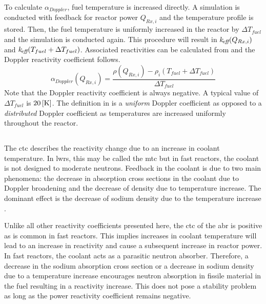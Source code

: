     To calculate $\alpha_{Doppler}$, fuel temperature is increased directly. A
    simulation is conducted with feedback for reactor power $Q_{Rx,i}$ and the
    temperature profile is stored. Then, the fuel temperature is uniformly 
    increased in the reactor by $\Delta T_{fuel}$ and the simulation is
    conducted again. This procedure will result in $k_{\!\mbox{\scriptsize \em eff}}(Q_{Rx,i})$ and
    ${k_{\!\mbox{\scriptsize \em eff}}(T_{fuel} + \Delta T_{fuel})}$. Associated reactivities can be
    calculated from  and the Doppler reactivity coefficient
    follows.
    \begin{equation}
      \label{eq:doppler_reactivity_coefficient}
      \alpha_{Doppler}(Q_{Rx,i}) = \frac{\rho(Q_{Rx,i}) - \rho_i(T_{fuel} +
        \Delta T_{fuel})} {\Delta T_{fuel}}
    \end{equation}
    Note that the Doppler reactivity coefficient is always negative.  A typical
    value of $\Delta T_{fuel}$ is $20\left[\text{{K}}\right]$.  The definition in
     is a \textit{uniform} Doppler
    coefficient as opposed to a \textit{distributed} Doppler coefficient as
    temperatures are increased uniformly throughout the reactor.

  \subsection{\texorpdfstring{}{Coolant Temperature
    Coefficient (CTC)}}
  \label{sec:coolant_temperature_reactivity_coefficient}
    The \gls{ctc} describes the reactivity change due to an increase in coolant
    temperature. In \glspl{lwr}, this may be called the \gls{mtc} but in fast
    reactors, the coolant is not designed to moderate neutrons. Feedback in the
    coolant is due to two main phenomena: the decrease in absorption cross
    sections in the coolant due to Doppler broadening and the decrease of
    density due to temperature increase. The dominant effect is the decrease of
    sodium density due to the temperature increase \cite{textbookknief}.

    Unlike all other reactivity coefficients presented here, the \gls{ctc} of
    the \gls{abr} is positive as is common in fast reactors. This implies
    increases in coolant temperature will lead to an increase in reactivity and
    cause a subsequent increase in reactor power. In fast reactors, the coolant
    acts as a parasitic neutron absorber. Therefore, a decrease in the sodium
    absorption cross section or a decrease in sodium density due to a
    temperature increase encourages neutron absorption in fissile material in
    the fuel resulting in a reactivity increase. This does not pose a stability
    problem as long as the power reactivity coefficient remains negative.

